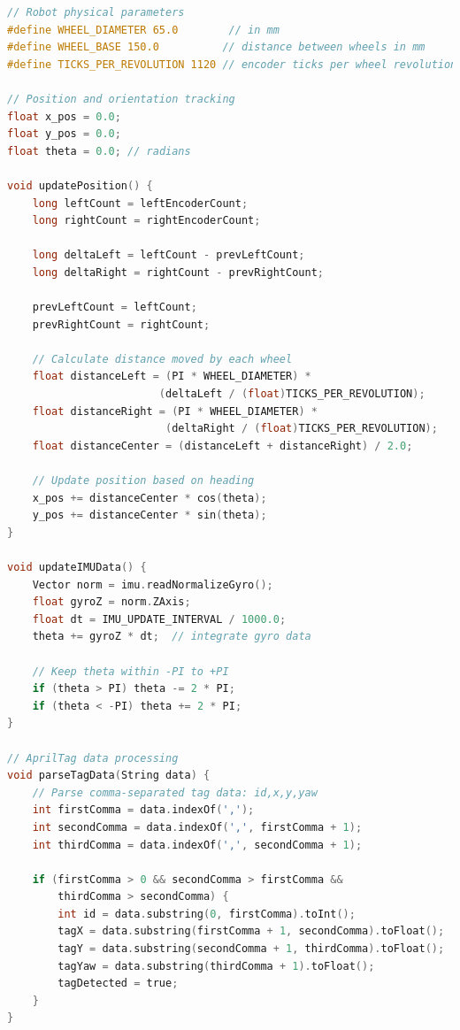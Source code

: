 \documentclass{article}
\begin{document}
\begin{lstlisting}[language=C, basicstyle=\ttfamily\footnotesize, frame=single, xleftmargin=10mm, xrightmargin=10mm]
// Robot physical parameters
#define WHEEL_DIAMETER 65.0        // in mm
#define WHEEL_BASE 150.0          // distance between wheels in mm
#define TICKS_PER_REVOLUTION 1120 // encoder ticks per wheel revolution

// Position and orientation tracking
float x_pos = 0.0;
float y_pos = 0.0;
float theta = 0.0; // radians

void updatePosition() {
    long leftCount = leftEncoderCount;
    long rightCount = rightEncoderCount;
    
    long deltaLeft = leftCount - prevLeftCount;
    long deltaRight = rightCount - prevRightCount;
    
    prevLeftCount = leftCount;
    prevRightCount = rightCount;
    
    // Calculate distance moved by each wheel
    float distanceLeft = (PI * WHEEL_DIAMETER) * 
                        (deltaLeft / (float)TICKS_PER_REVOLUTION);
    float distanceRight = (PI * WHEEL_DIAMETER) * 
                         (deltaRight / (float)TICKS_PER_REVOLUTION);
    float distanceCenter = (distanceLeft + distanceRight) / 2.0;
    
    // Update position based on heading
    x_pos += distanceCenter * cos(theta);
    y_pos += distanceCenter * sin(theta);
}

void updateIMUData() {
    Vector norm = imu.readNormalizeGyro();
    float gyroZ = norm.ZAxis;
    float dt = IMU_UPDATE_INTERVAL / 1000.0;
    theta += gyroZ * dt;  // integrate gyro data
    
    // Keep theta within -PI to +PI
    if (theta > PI) theta -= 2 * PI;
    if (theta < -PI) theta += 2 * PI;
}

// AprilTag data processing
void parseTagData(String data) {
    // Parse comma-separated tag data: id,x,y,yaw
    int firstComma = data.indexOf(',');
    int secondComma = data.indexOf(',', firstComma + 1);
    int thirdComma = data.indexOf(',', secondComma + 1);
    
    if (firstComma > 0 && secondComma > firstComma && 
        thirdComma > secondComma) {
        int id = data.substring(0, firstComma).toInt();
        tagX = data.substring(firstComma + 1, secondComma).toFloat();
        tagY = data.substring(secondComma + 1, thirdComma).toFloat();
        tagYaw = data.substring(thirdComma + 1).toFloat();
        tagDetected = true;
    }
}
\end{lstlisting}
\end{document}
